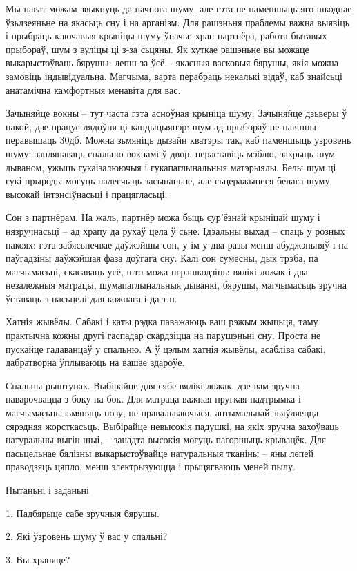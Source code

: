 Мы нават можам звыкнуць да начнога шуму, але гэта не паменшыць яго шкоднае ўзьдзеяньне на якасьць сну і на арганізм. Для рашэньня праблемы важна выявіць і прыбраць ключавыя крыніцы шуму ўначы: храп партнёра, работа бытавых прыбораў, шум з вуліцы ці з-за сьцяны. Як хуткае рашэньне вы можаце выкарыстоўваць бярушы: лепш за ўсё – якасныя васковыя бярушы, якія можна замовіць індывідуальна. Магчыма, варта перабраць некалькі відаў, каб знайсьці анатамічна камфортныя менавіта для вас.

Зачыняйце вокны – тут часта гэта асноўная крыніца шуму. Зачыняйце дзьверы ў пакой, дзе працуе лядоўня ці кандыцыянэр: шум ад прыбораў не павінны перавышаць 30дб. Можна зьмяніць дызайн кватэры так, каб паменшыць узровень шуму: заплянаваць спальню вокнамі ў двор, пераставіць мэблю, закрыць шум дываном, ужыць гукаізалюючыя і гукапаглынальныя матэрыялы. Белы шум ці гукі прыроды могуць палегчыць засынаньне, але сьцеражыцеся белага шуму высокай інтэнсіўнасьці і працягласьці.

Сон з партнёрам. На жаль, партнёр можа быць сур'ёзнай крыніцай шуму і нязручнасьці – ад храпу да рухаў цела ў сьне. Ідэальны выхад – спаць у розных пакоях: гэта забясьпечвае даўжэйшы сон, у ім у два разы менш абуджэньняў і на паўгадзіны даўжэйшая фаза доўгага сну. Калі сон сумесны, дык трэба, па магчымасьці, скасаваць усё, што можа перашкодзіць: вялікі ложак і два незалежныя матрацы, шумапаглынальныя дыванкі, бярушы, магчымасьць зручна ўставаць з пасьцелі для кожнага і да т.п.

Хатнія жывёлы. Сабакі і каты рэдка паважаюць ваш рэжым жыцьця, таму практычна кожны другі гаспадар скардзіцца на парушэньні сну. Проста не пускайце гадаванцаў у спальню. А ў цэлым хатнія жывёлы, асабліва сабакі, дабратворна ўплываюць на вашае здароўе.

Спальны рыштунак. Выбірайце для сябе вялікі ложак, дзе вам зручна паварочвацца з боку на бок. Для матраца важная пругкая падтрымка і магчымасьць зьмяняць позу, не правальваючыся, аптымальнай зьяўляецца сярэдняя жорсткасьць. Выбірайце невысокія падушкі, на якіх зручна захоўваць натуральны выгін шыі, – занадта высокія могуць пагоршыць крывацёк. Для пасьцельнае бялізны выкарыстоўвайце натуральныя тканіны – яны лепей праводзяць цяпло, менш электрызуюцца і прыцягваюць меней пылу.

Пытаньні і заданьні

1. Падбярыце сабе зручныя бярушы.

2. Які ўзровень шуму ў вас у спальні?

3. Вы храпяце?


